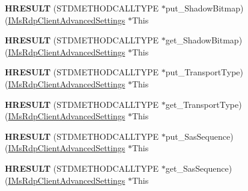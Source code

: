 \begin{DoxyCompactItemize}
{\bfseries H\+R\+E\+S\+U\+LT} (S\+T\+D\+M\+E\+T\+H\+O\+D\+C\+A\+L\+L\+T\+Y\+PE $\ast$put\+\_\+\+Shadow\+Bitmap)(\hyperlink{interface_m_s_t_s_c_lib_1_1_i_ms_rdp_client_advanced_settings}{I\+Ms\+Rdp\+Client\+Advanced\+Settings} $\ast$This
\item 
\mbox{\label{struct_m_s_t_s_c_lib_1_1_i_ms_rdp_client_advanced_settings_vtbl_a09555d6cf6e009fea16ef17f51a01eef}} 
{\bfseries H\+R\+E\+S\+U\+LT} (S\+T\+D\+M\+E\+T\+H\+O\+D\+C\+A\+L\+L\+T\+Y\+PE $\ast$get\+\_\+\+Shadow\+Bitmap)(\hyperlink{interface_m_s_t_s_c_lib_1_1_i_ms_rdp_client_advanced_settings}{I\+Ms\+Rdp\+Client\+Advanced\+Settings} $\ast$This
\item 
\mbox{\label{struct_m_s_t_s_c_lib_1_1_i_ms_rdp_client_advanced_settings_vtbl_a850d62bd4a8b85955ce757b6984ecbca}} 
{\bfseries H\+R\+E\+S\+U\+LT} (S\+T\+D\+M\+E\+T\+H\+O\+D\+C\+A\+L\+L\+T\+Y\+PE $\ast$put\+\_\+\+Transport\+Type)(\hyperlink{interface_m_s_t_s_c_lib_1_1_i_ms_rdp_client_advanced_settings}{I\+Ms\+Rdp\+Client\+Advanced\+Settings} $\ast$This
\item 
\mbox{\label{struct_m_s_t_s_c_lib_1_1_i_ms_rdp_client_advanced_settings_vtbl_a65d42b4b55f42660e3d5691ee1d8c95f}} 
{\bfseries H\+R\+E\+S\+U\+LT} (S\+T\+D\+M\+E\+T\+H\+O\+D\+C\+A\+L\+L\+T\+Y\+PE $\ast$get\+\_\+\+Transport\+Type)(\hyperlink{interface_m_s_t_s_c_lib_1_1_i_ms_rdp_client_advanced_settings}{I\+Ms\+Rdp\+Client\+Advanced\+Settings} $\ast$This
\item 
\mbox{\label{struct_m_s_t_s_c_lib_1_1_i_ms_rdp_client_advanced_settings_vtbl_ac4b19a960df5327b274d86dffa01993c}} 
{\bfseries H\+R\+E\+S\+U\+LT} (S\+T\+D\+M\+E\+T\+H\+O\+D\+C\+A\+L\+L\+T\+Y\+PE $\ast$put\+\_\+\+Sas\+Sequence)(\hyperlink{interface_m_s_t_s_c_lib_1_1_i_ms_rdp_client_advanced_settings}{I\+Ms\+Rdp\+Client\+Advanced\+Settings} $\ast$This
\item 
\mbox{\label{struct_m_s_t_s_c_lib_1_1_i_ms_rdp_client_advanced_settings_vtbl_ac1fcee59a5861fe78755b543e8fd1948}} 
{\bfseries H\+R\+E\+S\+U\+LT} (S\+T\+D\+M\+E\+T\+H\+O\+D\+C\+A\+L\+L\+T\+Y\+PE $\ast$get\+\_\+\+Sas\+Sequence)(\hyperlink{interface_m_s_t_s_c_lib_1_1_i_ms_rdp_client_advanced_settings}{I\+Ms\+Rdp\+Client\+Advanced\+Settings} $\ast$This

\end{DoxyCompactItemize}
